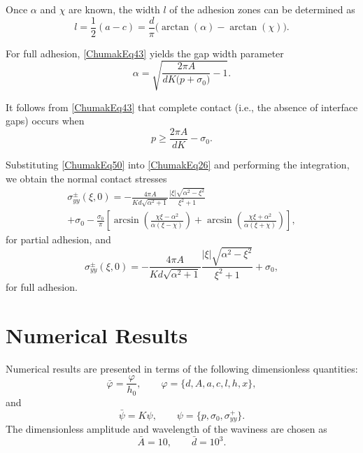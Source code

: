 Once $\alpha$ and $\chi$ are known, the width $l$ of the adhesion zones can be determined as
\begin{equation}
	\label{ChumakEq55}
	l=\frac{1}{2}(a-c)
	=
	\frac{d}{\pi}\bigl(\arctan(\alpha)-\arctan(\chi)\bigr).
\end{equation}

For full adhesion, \eqref{ChumakEq43} yields the gap width parameter
\begin{equation}
	\label{ChumakEq56}
	\alpha
	=
	\sqrt{\frac{2\pi A}{dK\bigl(p+\sigma_{0}\bigr)}-1}.
\end{equation}

It follows from \eqref{ChumakEq43} that complete contact (i.e., the absence of interface gaps) occurs when
\begin{equation}
	\label{ChumakEq57}
	p \ge \frac{2\pi A}{dK}-\sigma_{0}.
\end{equation}

Substituting \eqref{ChumakEq50} into \eqref{ChumakEq26} and performing the integration, we obtain the normal contact stresses
\begin{multline}
	\label{ChumakEq58}
	\sigma_{yy}^{\pm}(\xi,0)
	=
	-\frac{4\pi A}{Kd\sqrt{\alpha^{2}+1}}
	\frac{|\xi|\sqrt{\alpha^{2}-\xi^{2}}}{\xi^{2}+1}
	\\
	+\sigma_{0}
	-\frac{\sigma_{0}}{\pi}
	\left[
	\arcsin\!\left(\frac{\chi\xi-\alpha^{2}}{\alpha(\xi-\chi)}\right)
	+
	\arcsin\!\left(\frac{\chi\xi+\alpha^{2}}{\alpha(\xi+\chi)}\right)
	\right],
\end{multline}
for partial adhesion, and
\begin{equation}
	\label{ChumakEq59}
	\sigma_{yy}^{\pm}(\xi,0)
	=
	-\frac{4\pi A}{Kd\sqrt{\alpha^{2}+1}}
	\frac{|\xi|\sqrt{\alpha^{2}-\xi^{2}}}{\xi^{2}+1}
	+\sigma_{0},
\end{equation}
for full adhesion.

\section{Numerical Results}

 Numerical results are presented in terms of the following dimensionless quantities:
\[
\bar{\varphi}=\frac{\varphi}{h_{0}}, \qquad
\varphi=\{d,A,a,c,l,h,x\},
\]
and
\[
\bar{\psi}=K\psi, \qquad
\psi=\{p,\sigma_{0},\sigma_{yy}^{+}\}.
\]
The dimensionless amplitude and wavelength of the waviness are chosen as
\[
\bar{A}=10, \qquad \bar{d}=10^{3}.
\]

